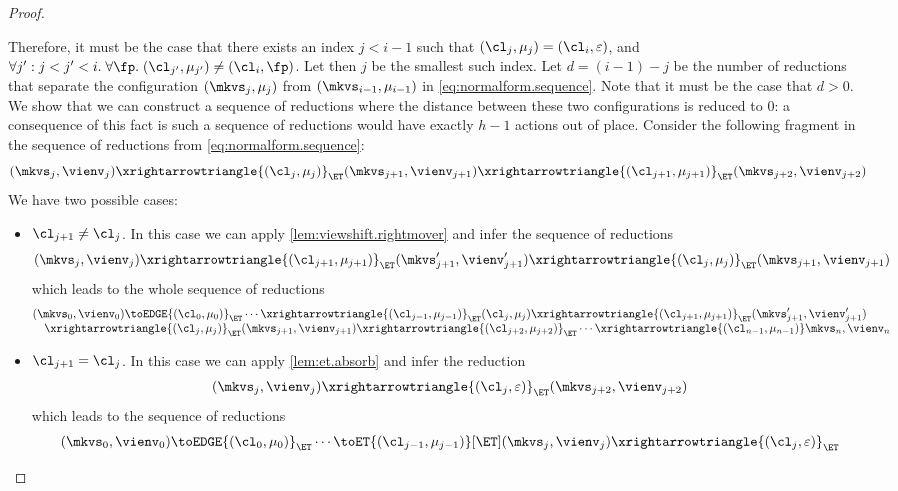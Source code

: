\begin{proof}
\begin{enumerate}
Therefore, it must be the case that there exists an index $j < i-1$ such that $(\cl_{j}, \mu_{j}) = (\cl_{i}, \varepsilon)$, 
and $\forall j': j< j' < i.\;\forall \fp.\;(\cl_{j'}, \mu_{j'}) \neq (\cl_{i}, \fp)$. Let then $j$ be the smallest such index. 
Let $d = (i-1)-j$ be the number of reductions that separate the configuration $(\mkvs_{j}, \mu_{j})$ from 
$(\mkvs_{i-1}, \mu_{i-1})$ in \cref{eq:normalform.sequence}. Note that it must be the case that $d > 0$. We show that we can 
construct a sequence of reductions where the distance between these two configurations is reduced to $0$: 
a consequence of this fact is such a sequence of reductions would have exactly $h-1$ actions out of place.
Consider the following fragment in the sequence of reductions from \cref{eq:normalform.sequence}:
\[
(\mkvs_{j}, \vienv_{j}) \xrightarrowtriangle{(\cl_{j}, \mu_{j})}_{\ET} (\mkvs_{j+1}, \vienv_{j+1}) 
\xrightarrowtriangle{(\cl_{j+1}, \mu_{j+1})}_{\ET} (\mkvs_{j+2}, \vienv_{j+2})
\]
We have two possible cases: 
\begin{itemize}
\item $\cl_{j+1} \neq \cl_{j}$. In this case we can apply \cref{lem:viewshift.rightmover} and infer the sequence of 
reductions 
\[
(\mkvs_{j}, \vienv_{j}) \xrightarrowtriangle{(\cl_{j+1}, \mu_{j+1})}_{\ET} (\mkvs_{j+1}', \vienv_{j+1}') 
\xrightarrowtriangle{(\cl_{j}, \mu_{j})}_{\ET} (\mkvs_{j+1}, \vienv_{j+1})
\]
which leads to the whole sequence of reductions 
\[
\begin{array}{@{}l@{}}
(\mkvs_{0}, \vienv_{0}) \toEDGE{(\cl_{0}, \mu_{0})}_{\ET} \cdots 
\xrightarrowtriangle{(\cl_{j-1}, \mu_{j-1})}_{\ET} (\cl_{j}, \mu_{j}) 
\xrightarrowtriangle{(\cl_{j+1}, \mu_{j+1})}_{\ET} (\mkvs'_{j+1}, \vienv'_{j+1})  \\
\quad \xrightarrowtriangle{(\cl_{j}, \mu_{j})}_{\ET} (\mkvs_{j+1}, \vienv_{j+1})  
\xrightarrowtriangle{(\cl_{j+2}, \mu_{j+2})}_{\ET} \cdots \xrightarrowtriangle{(\cl_{n-1}, \mu_{n-1})} \mkvs_{n}, \vienv_{n}
\end{array}
\]
\item $\cl_{j+1} = \cl_{j}$. In this case we can apply \cref{lem:et.absorb} and infer the reduction 
\[
(\mkvs_{j}, \vienv_{j}) \xrightarrowtriangle{(\cl_{j}, \varepsilon)}_{\ET} (\mkvs_{j+2}, \vienv_{j+2})
\]
which leads to the sequence of reductions 
\[
\begin{array}{@{}l@{}}
(\mkvs_{0}, \vienv_{0}) \toEDGE{(\cl_{0}, \mu_{0})}_{\ET} \cdots 
\toET{(\cl_{j-1}, \mu_{j-1})}[\ET] (\mkvs_{j}, \vienv_{j}) \xrightarrowtriangle{(\cl_{j}, \varepsilon)}_{\ET}  \\

\end{array}\]
\end{itemize}
\end{enumerate}
\end{proof}
